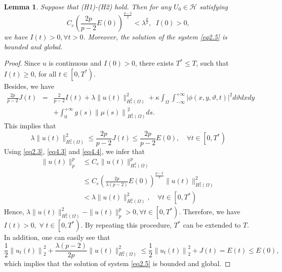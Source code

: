 \documentclass[12pt]{article}
\numberwithin{equation}{section}
\newtheorem{lemma}[theorem]{Lemma}
\newtheorem{remark}[theorem]{Remark}
\begin{document}
\begin{lemma}\label{lem4.1}
Suppose that (H1)-(H2) hold. Then for any $U_{0} \in \mathcal{H}$ satisfying
\begin{equation}\label{eq4.3}
C_{e}\left(\frac{2 p}{p-2} E(0)\right)^{\frac{p-2}{2}}<\lambda^{\frac{p}{2}},\;\; I(0)>0,
\end{equation}
we have  $I(t)>0, \forall t>0$. Moreover,  the solution of the system \eqref{eq2.5} is bounded and global.
\end{lemma}
\begin{proof}
Since $u$ is continuous and $I\left(0\right)>0$, there exists $T^{*} \leq T$, such that $I(t) \geq 0$, for all $t \in\left[0, T^{*}\right)$.\\
Besides, we have
\begin{eqnarray*}
\frac{2p}{p-2} J(t)&=&\frac{2}{p-2} I(t)+ \lambda\|u(t)\|_{H^2_{*} (\Omega)}^{2}+\kappa \int_{\Omega} \int_{-\infty}^{+\infty}|\phi(x,y,\vartheta, t)|^{2} d\vartheta dx dy\nonumber\\
&&+\int_{0}^{+\infty} g(s)\left\|\mu(s)\right\|^{2}_{H^2_{*} (\Omega)} ds.
\end{eqnarray*}
This implies that
\begin{equation}\label{eq4.4}
\lambda\|u(t)\|_{H^2_{*} (\Omega)}^{2} \leq \frac{2 p}{p-2} J(t) \leq \frac{2 p}{p-2} E(0), \quad \forall t \in\left[0, T^{*}\right)
\end{equation}
Using \eqref{eq2.3}, \eqref{eq4.3} and \eqref{eq4.4},  we infer that
\begin{equation}
\begin{aligned}
\| u(t)\|_{p}^{p} &\leq C_e \|u(t)\|_{H^2_{*} (\Omega)}^{p} \\
& \leq C_{e}\left(\frac{2 p}{\lambda(p-2)} E(0)\right)^{\frac{p-2}{2 }} \| u(t)\|_{H^2_{*} (\Omega)}^{2} \\
&< \lambda \|u(t)\|_{H^2_{*} (\Omega)}^{2}, \quad \forall t \in\left[0, T^{*}\right)
\end{aligned}
\end{equation}
Hence, $\lambda\|u(t)\|_{H^2_{*} (\Omega)}^{2}-\| u(t)\|_{p}^{p}>0, \forall t \in\left[0, T^{*}\right)$. Therefore, we have $I(t)>0,\;\forall\; t \in\left[0, T^{*}\right)$. By repeating this procedure, $T^{*}$ can be extended to $T$.\\
In addition, one can easily see that
$$ \frac{1}{2}\left\|u_{t}(t)\right\|_{2}^{2}+\frac{\lambda(p-2)}{2 p }\|u(t)\|_{H^2_{*} (\Omega)}^{2}\leq \frac{1}{2}\left\|u_{t}(t)\right\|_{2}^{2}+J(t)=E(t)\leq E(0),$$
which implies that the solution of system \eqref{eq2.5} is bounded and global.
\end{proof}
{}
\end{document}
